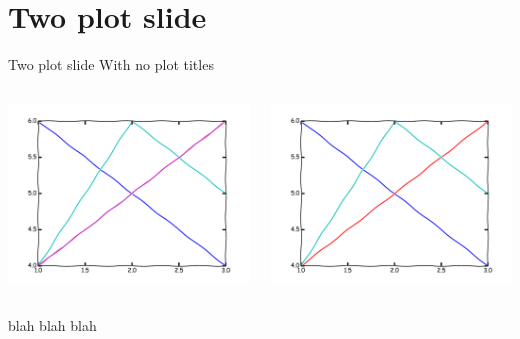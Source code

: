 \section{Two plot slide}
\begin{frame}{Two plot slide}
With no plot titles
\begin{columns}
\begin{column}{0.5\textwidth}
\begin{center}
\includegraphics[width=\textwidth]{example/plot1.pdf}
\\
\end{center}
\end{column}

\begin{column}{0.5\textwidth}
\begin{center}
\includegraphics[width=\textwidth]{example/plot4.pdf}
\end{center}
\end{column}
\end{columns}
blah blah blah
\end{frame}

